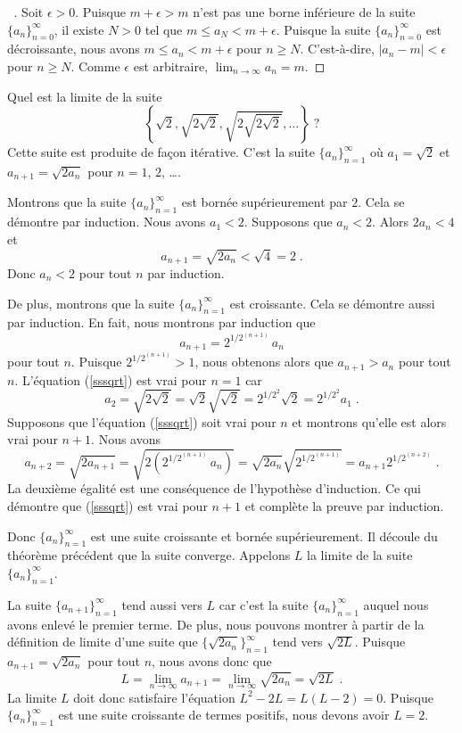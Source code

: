 {\begin{proof}[\UOproof\ \theory]
Soit $\epsilon >0$.  Puisque $m+\epsilon > m$ n'est pas une borne
inférieure de la suite $\displaystyle \{ a_n \}_{n=0}^\infty$, il
existe $N>0$ tel que $m \leq a_N < m+\epsilon$.  Puisque la suite
$\displaystyle \{ a_n \}_{n=0}^\infty$ est décroissante, nous avons
$m \leq a_n < m+\epsilon$ pour $n\geq N$.  C'est-à-dire,
$|a_n-m|<\epsilon$ pour $n\geq N$.  Comme $\epsilon$ est arbitraire,
$\displaystyle \lim_{n\to \infty} a_n = m$.
\end{proof}

\begin{egg}[\theory]
Quel est la limite de la suite
\[
\left\{ \sqrt{2}, \sqrt{2\sqrt{2}}, \sqrt{2\sqrt{2\sqrt{2}}}, \ldots
\right\} \; ?
\]
Cette suite est produite de façon itérative. C'est la suite
$\{a_n\}_{n=1}^\infty$ où $a_1=\sqrt{2}$ et $a_{n+1} = \sqrt{2a_n}$
pour $n=1$, $2$, \ldots.

Montrons que la suite $\{a_n\}_{n=1}^\infty$ est bornée
supérieurement par $2$.  Cela se démontre par induction.  Nous avons
$a_1<2$.  Supposons que $a_n < 2$.  Alors $2a_n < 4$ et
\[
a_{n+1} = \sqrt{2a_n} < \sqrt{4} = 2 \; .
\]
Donc $a_n <2$ pour tout $n$ par induction.

De plus, montrons que la suite $\{a_n\}_{n=1}^\infty$ est
croissante.   Cela se démontre aussi par induction.  En fait, nous  montrons
par induction que
\begin{equation}\label{sssqrt}
a_{n+1} = 2^{1/2^{(n+1)}}\,a_n
\end{equation}
pour tout $n$.  Puisque $2^{1/2^{(n+1)}} > 1$, nous obtenons alors que
$a_{n+1} > a_n$ pour tout $n$.  L'équation (\ref{sssqrt}) est vrai
pour $n=1$ car
\[
a_2 = \sqrt{2 \sqrt{2}} = \sqrt{2} \sqrt{\sqrt{2}} =
2^{1/2^2} \sqrt{2} = 2^{1/2^2} a_1 \; .
\]
Supposons que l'équation (\ref{sssqrt}) soit vrai pour $n$ et
montrons qu'elle est alors vrai pour $n+1$.  Nous avons
\[
a_{n+2} = \sqrt{2a_{n+1}} = \sqrt{2 \left(2^{1/2^{(n+1)}} \, a_n\right)}
= \sqrt{2 a_n} \sqrt{2^{1/2^{(n+1)}}}
= a_{n+1} 2^{1/2^{(n+2)}} \; .
\]
La deuxième égalité est une conséquence de l'hypothèse d'induction.
Ce qui démontre que (\ref{sssqrt}) est vrai pour $n+1$ et complète
la preuve par induction.

Donc $\{a_n\}_{n=1}^\infty$ est une suite croissante et
bornée supérieurement.  Il découle du théorème précédent que la suite
converge. Appelons $L$ la limite de la suite $\{a_n\}_{n=1}^\infty$.

La suite $\{ a_{n+1} \}_{n=1}^\infty$ tend aussi vers $L$ car c'est la
suite $\{ a_n\}_{n=1}^\infty$ auquel nous avons enlevé le premier terme.  De
plus, nous pouvons montrer à partir de la définition de limite d'une suite
que $\{ \sqrt{2a_n} \}_{n=1}^\infty$ tend vers $\sqrt{2L}$.  Puisque
$a_{n+1} = \sqrt{2 a_n}$ pour tout $n$, nous avons donc que
\[
L= \lim_{n\rightarrow \infty} a_{n+1} =
\lim_{n\rightarrow \infty} \sqrt{2 a_n} = \sqrt{2L} \; .
\]
La limite $L$ doit donc satisfaire l'équation $L^2-2L = L(L-2) = 0$.
Puisque $\{ a_n \}_{n=1}^\infty$ est une suite croissante de termes
positifs, nous devons avoir $L=2$.
\end{egg}

}
